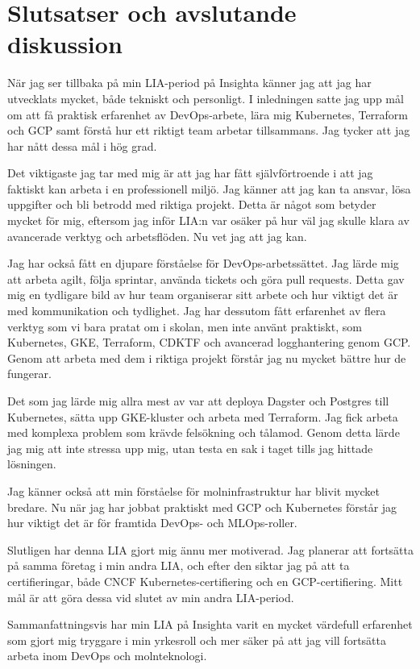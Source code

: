 \section{Slutsatser och avslutande diskussion}

När jag ser tillbaka på min LIA-period på Insighta känner jag att jag har utvecklats mycket, både tekniskt och personligt. I inledningen satte jag upp mål om att få praktisk erfarenhet av DevOps-arbete, lära mig Kubernetes, Terraform och GCP samt förstå hur ett riktigt team arbetar tillsammans. Jag tycker att jag har nått dessa mål i hög grad.

Det viktigaste jag tar med mig är att jag har fått självförtroende i att jag faktiskt kan arbeta i en professionell miljö. Jag känner att jag kan ta ansvar, lösa uppgifter och bli betrodd med riktiga projekt. Detta är något som betyder mycket för mig, eftersom jag inför LIA:n var osäker på hur väl jag skulle klara av avancerade verktyg och arbetsflöden. Nu vet jag att jag kan.

Jag har också fått en djupare förståelse för DevOps-arbetssättet. Jag lärde mig att arbeta agilt, följa sprintar, använda tickets och göra pull requests. Detta gav mig en tydligare bild av hur team organiserar sitt arbete och hur viktigt det är med kommunikation och tydlighet. Jag har dessutom fått erfarenhet av flera verktyg som vi bara pratat om i skolan, men inte använt praktiskt, som Kubernetes, GKE, Terraform, CDKTF och avancerad logghantering genom GCP. Genom att arbeta med dem i riktiga projekt förstår jag nu mycket bättre hur de fungerar.

Det som jag lärde mig allra mest av var att deploya Dagster och Postgres till Kubernetes, sätta upp GKE-kluster och arbeta med Terraform. Jag fick arbeta med komplexa problem som krävde felsökning och tålamod. Genom detta lärde jag mig att inte stressa upp mig, utan testa en sak i taget tills jag hittade lösningen.

Jag känner också att min förståelse för molninfrastruktur har blivit mycket bredare. Nu när jag har jobbat praktiskt med GCP och Kubernetes förstår jag hur viktigt det är för framtida DevOps- och MLOps-roller.

Slutligen har denna LIA gjort mig ännu mer motiverad. Jag planerar att fortsätta på samma företag i min andra LIA, och efter den siktar jag på att ta certifieringar, både CNCF Kubernetes-certifiering och en GCP-certifiering. Mitt mål är att göra dessa vid slutet av min andra LIA-period.

Sammanfattningsvis har min LIA på Insighta varit en mycket värdefull erfarenhet som gjort mig tryggare i min yrkesroll och mer säker på att jag vill fortsätta arbeta inom DevOps och molnteknologi.